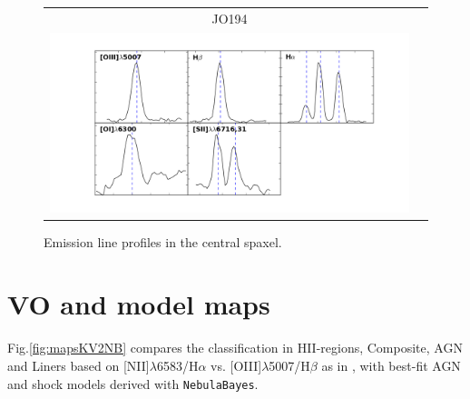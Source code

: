 \documentclass[fleqn,usenatbib]{mnras}
\begin{document}
\begin{figure}
\begin{tabular}{cc}
		JO194&\\
		\includegraphics[width=.5\linewidth]{Plots/alines_peak_JO194} & \\				
	\end{tabular} 
	\caption{Emission line profiles in the central spaxel.\label{fig:emlines}}
\end{figure}

\section{VO and model maps}
\label{app:class_maps}

Fig.\ref{fig:mapsKV2NB} compares the classification in HII-regions, Composite, AGN and Liners based on [NII]$\lambda$6583/H$\alpha$ vs. [OIII]$\lambda$5007/H$\beta$ as in \citet{2017Natur.548..304P}, with best-fit AGN and shock models derived with \texttt{NebulaBayes}.
\end{document}
